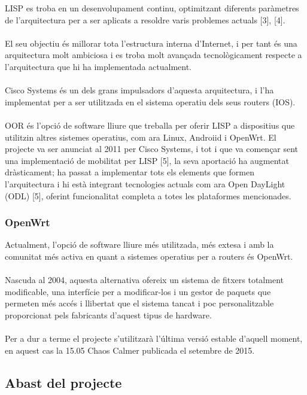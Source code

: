 \documentclass[11pt]{article}
\begin{document}
LISP es troba en un desenvolupament continu, optimitzant diferents paràmetres de l’arquitectura per a ser aplicats a resoldre varis problemes actuals [3], [4].\\
\\
El seu objectiu és millorar tota l’estructura interna d’Internet, i per tant és una arquitectura molt ambiciosa i es troba molt avançada tecnològicament respecte a l’arquitectura que hi ha implementada actualment. \\
\\
Cisco Systems és un dels grans impulsadors d’aquesta arquitectura, i l’ha implementat per a ser utilitzada en el sistema operatiu dels seus routers (IOS).\\
\\
OOR és l’opció de software lliure que treballa per oferir LISP a dispositius que utilitzin altres sistemes operatius, com ara Linux, Androiid i OpenWrt. El projecte va ser anunciat al 2011 per Cisco Systems, i tot i que va començar sent una implementació de mobilitat per LISP [5], la seva aportació ha augmentat dràsticament; ha passat a implementar tots els elements que formen l’arquitectura i hi està integrant tecnologies actuals com ara Open DayLight (ODL) [5], oferint funcionalitat completa a totes les plataformes mencionades.

\subsubsection{OpenWrt}
Actualment, l’opció de software lliure més utilitzada, més extesa i amb la comunitat més activa en quant a sistemes operatius per a routers és OpenWrt. \\
\\
Nascuda al 2004, aquesta alternativa ofereix un sistema de fitxers totalment modificable, una interfície per a modificar-los i un gestor de paquets que permeten més accés i llibertat que el sistema tancat i poc personalitzable proporcionat pels fabricants d’aquest tipus de hardware.\\
\\
Per a dur a terme el projecte s’utilitzarà l’última versió estable d’aquell moment, en aquest cas la 15.05 Chaos Calmer publicada el setembre de 2015.
\subsection{Abast del projecte}
\end{document}
